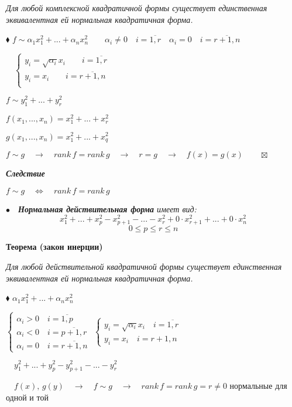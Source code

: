 \documentclass[a4paper, 12pt]{report}
\begin{document}
	\textit{Для любой комплексной квадратичной формы существует единственная эквивалентная ей нормальная квадратичная форма.}
	\par\bigskip
	$\blacklozenge$ $f \sim \alpha_1 x_1^2+...+\alpha_n x_n^2 \quad \quad \alpha_i\ne0 \quad i=\overline{1,r}\quad \alpha_i=0\quad i=\overline{r+1,n}$
	
	$\quad \begin{cases}
		y_i=\sqrt{\alpha_i} x_i \quad \quad i=\overline{1,r}\\
		y_i=x_i \quad \quad i=\overline{r+1,n}\\
	\end{cases}$
	
	\quad $f \sim y_1^2+...+y_r^2$
	
	\quad$f(x_1,...,x_n)=x_1^2+...+x_r^2$
	
	\quad$g(x_1,...,x_n)=x_1^2+...+x_q^2$
	
	\quad$f \sim g \quad \rightarrow \quad rank\,f=rank\,g \quad\rightarrow \quad r=g \quad \rightarrow \quad f(x)=g(x)\quad \quad \boxtimes$
	\par\bigskip
	\textit{\textbf{Следствие}}
	
	$f \sim g \quad \Longleftrightarrow \quad rank\,f=rank\,g $
	\par \bigskip
	$\bullet\quad$\textit{\textbf{Нормальная действительная форма} имеет вид:}
	$$x_1^2+...+x_p^2-x_{p+1}^2-...-x_r^2+0 \cdot x_{r+1}^2+...+0 \cdot x_n^2$$
	$$0 \le p \le r \le n$$
	\par \bigskip
	\textbf{Теорема (закон инерции)}
	
	\textit{Для любой действительной квадратичной формы существует единственная эквивалентная ей нормальная квадратичная форма.}
	\par\bigskip
	$\blacklozenge$ $\alpha_1 x_1^2+...+\alpha_n x_n^2$
	
	\quad$\begin{cases}
		\alpha_i > 0 \quad i=\overline{1,p}\\
		\alpha_i < 0 \quad i=\overline{p+1,r}\\
		\alpha_i=0 \quad i=\overline{r+1,n}
	\end{cases}$ \quad \quad $\begin{cases}
		y_i=\sqrt{\alpha_i} x_i \quad i=\overline{1,r}\\
		y_i=x_i \quad i={r+1, n}
	\end{cases}$
	
	$\quad y_1^2+...+y_p^2-y_{p+1}^2-...-y_r^2$
	
	$\quad f(x), \, g(y)\quad  \rightarrow \quad f \sim g \quad \rightarrow \quad rank \, f = rank \, g=r \ne 0$ нормальные для одной и той 
	
\end{document}
